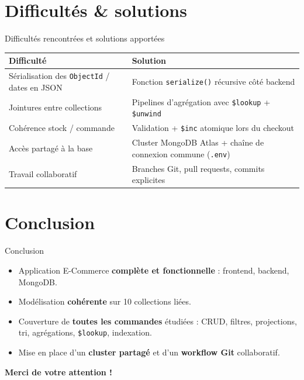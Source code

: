 \documentclass[aspectratio=169]{beamer}
\begin{document}
\section{Difficultés \& solutions}
\begin{frame}{Difficultés rencontrées et solutions apportées}
  \centering\small
  \begin{tabular}{@{}p{5.5cm} p{6cm}@{}}
    \toprule
    \textbf{Difficulté} & \textbf{Solution} \\
    \midrule
    Sérialisation des \texttt{ObjectId} / dates en JSON & Fonction \texttt{serialize()} récursive côté backend \\
    Jointures entre collections & Pipelines d'agrégation avec \texttt{\$lookup} + \texttt{\$unwind} \\
    Cohérence stock / commande & Validation + \texttt{\$inc} atomique lors du checkout \\
    Accès partagé à la base & Cluster MongoDB Atlas + chaîne de connexion commune (\texttt{.env}) \\
    Travail collaboratif & Branches Git, pull requests, commits explicites \\
    \bottomrule
  \end{tabular}
\end{frame}

\section{Conclusion}
\begin{frame}{Conclusion}
  \begin{itemize}
    \item Application E-Commerce \textbf{complète et fonctionnelle} : frontend, backend, MongoDB.
    \item Modélisation \textbf{cohérente} sur 10 collections liées.
    \item Couverture de \textbf{toutes les commandes} étudiées : CRUD, filtres, projections,
          tri, agrégations, \texttt{\$lookup}, indexation.
    \item Mise en place d'un \textbf{cluster partagé} et d'un \textbf{workflow Git} collaboratif.
  \end{itemize}
  \vspace{1em}
  \centering
  \Large\color{mongogreen}\textbf{Merci de votre attention !}
\end{frame}
\end{document}
